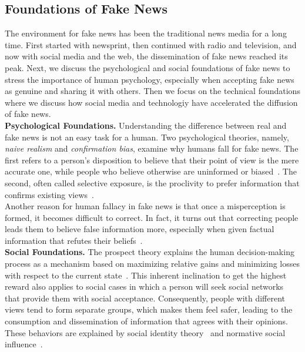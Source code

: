 \subsection{Foundations of Fake News}
\label{subsec:fakeNewsDetection_FoundationsOfFakeNews}
The environment for fake news has been the traditional news media for a long time. First started with newsprint, then continued with radio
and television, and now with social media and the web, the dissemination of fake news reached its peak. Next, we discuss the psychological
and social foundations of fake news to stress the importance of human psychology, especially when accepting fake news as genuine and sharing
it with others. Then we focus on the technical foundations where we discuss how social media and technologiy have accelerated the diffusion of
fake news.\\
\textbf{Psychological Foundations.}  Understanding the difference between real and fake news is not an easy task for a human. Two psychological theories, namely, \emph{naive realism} and \emph{confirmation bias}, examine why humans fall for fake news. The first refers to a person's disposition to believe that their point of view is the mere accurate one, while people who believe otherwise are uninformed or biased~\parencite{NaiveRealism_Reed}. The second, often called selective exposure, is the proclivity to prefer information that confirms existing views~\parencite{ConfirmationBias_Nickerson}.\\
Another reason for human fallacy in fake news is that once a misperception is formed, it becomes difficult to correct. In fact, it turns out that correcting people leads them to believe false information more, especially when given factual information that refutes their beliefs~\parencite{WhenCorrectionsFail_Nyhan}.\\
\textbf{Social Foundations.}  The prospect theory explains the human decision-making process as a mechanism based on maximizing relative gains and minimizing losses with respect to the current state~\parencite{ProspectTheory_Kahneman, AdvancesInProspectTheory_Kahneman}. This inherent inclination to get the highest reward also applies to social cases in which a person will seek social networks that provide them with social acceptance. Consequently,  people with different views tend to form separate groups, which makes them feel safer, leading to the consumption
and dissemination of information that agrees with their opinions. These behaviors are explained by social identity
theory~\parencite{SocialIdentityTheory_Ashforth} and normative social influence~\parencite{NormativeSocialInfluence_Asch}.
